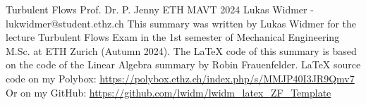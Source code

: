 \raggedbottom
\raggedright
\raggedcolumns
\begin{multicols*}{4}



	\DocumentInfo
	{Turbulent Flows} %
	{Prof. Dr. P. Jenny \newline
		ETH MAVT 2024 \newline
		Lukas Widmer - lukwidmer@student.ethz.ch} %
	{This summary was written by Lukas Widmer for the lecture Turbulent Flows Exam in the 1st semester of Mechanical Engineering M.Sc. at ETH Zurich (Autumn 2024). \vspace{1mm}\newline
		The LaTeX code of this summary is based on the code of the Linear Algebra summary by Robin Frauenfelder. \vspace{1mm} \newline
		\LaTeX\hspace{1pt} source code on my Polybox: \newline
		\tiny \url{https://polybox.ethz.ch/index.php/s/MMJP40I3JR9Qmv7} \small \newline
		Or on my GitHub: \newline
		\tiny \url{https://github.com/lwidm/lwidm_latex_ZF_Template}\small
	}


	





\end{multicols*}



